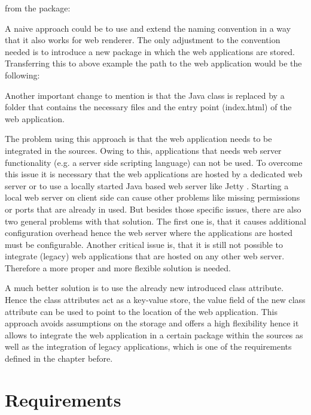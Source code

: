 \indent \centerline{}

from the package:  

\indent \centerline{}

A naive approach could be to use and extend the naming convention in a way that it also works for web renderer.
The only adjustment to the convention needed is to introduce a new package in which the web applications are stored.
Transferring this to above example the path to the web application would be the following:

\indent \centerline{}

Another important change to mention is that the Java class is replaced by a folder that contains the necessary files and the entry point (index.html) of the web application.

The problem using this approach is that the web application needs to be integrated in the sources.
Owing to this, applications that needs web server functionality (e.g.
a server side scripting language) can not be used.
To overcome this issue it is necessary that the web applications are hosted by a dedicated web server or to use a locally started Java based web server like Jetty \autocite{conception:jetty}.
Starting a local web server on client side can cause other problems like missing permissions or ports that are already in used.
But besides those specific issues, there are also two general problems with that solution.
The first one is, that it causes additional configuration overhead hence the web server where the applications are hosted must be configurable.
Another critical issue is, that it is still not possible to integrate (legacy) web applications that are hosted on any other web server.
Therefore a more proper and more flexible solution is needed.

A much better solution is to use the already new introduced class attribute.
Hence the class attributes act as a key-value store, the value field of the new class attribute can be used to point to the location of the web application.
This approach avoids assumptions on the storage and offers a high flexibility hence it allows to integrate the web application in a certain package within the sources as well as the integration of legacy applications, which is one of the requirements defined in the chapter before.

\section{Requirements}\label{chap:requirements}
